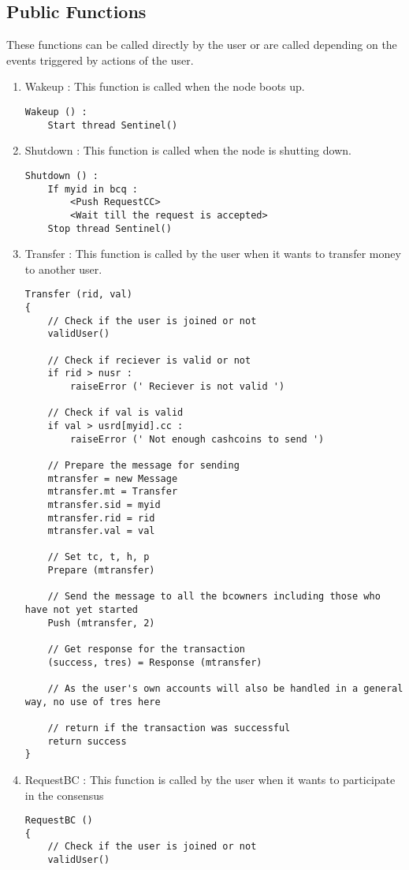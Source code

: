 \subsection{Public Functions}
These functions can be called directly by the user or are called depending on the events triggered by actions of the user.
\begin{enumerate}
    \item Wakeup : This function is called when the node boots up.
    \begin{lstlisting}
Wakeup () :
    Start thread Sentinel()
    \end{lstlisting}
    \item Shutdown : This function is called when the node is shutting down.
    \begin{lstlisting}
Shutdown () :
    If myid in bcq :
        <Push RequestCC>
        <Wait till the request is accepted>
    Stop thread Sentinel()
    \end{lstlisting}
    \item Transfer : This function is called by the user when it wants to transfer money to another user.
    \begin{lstlisting}
Transfer (rid, val)
{
    // Check if the user is joined or not
    validUser()
    
    // Check if reciever is valid or not
    if rid > nusr :
        raiseError (' Reciever is not valid ')

    // Check if val is valid
    if val > usrd[myid].cc :
        raiseError (' Not enough cashcoins to send ')

    // Prepare the message for sending
    mtransfer = new Message
    mtransfer.mt = Transfer
    mtransfer.sid = myid
    mtransfer.rid = rid
    mtransfer.val = val

    // Set tc, t, h, p
    Prepare (mtransfer)

    // Send the message to all the bcowners including those who have not yet started
    Push (mtransfer, 2)

    // Get response for the transaction
    (success, tres) = Response (mtransfer)

    // As the user's own accounts will also be handled in a general way, no use of tres here

    // return if the transaction was successful
    return success
}
    \end{lstlisting}
    \item RequestBC : This function is called by the user when it wants to participate in the consensus
    \begin{lstlisting}
RequestBC ()
{
    // Check if the user is joined or not
    validUser()


\end{lstlisting}
\end{enumerate}
